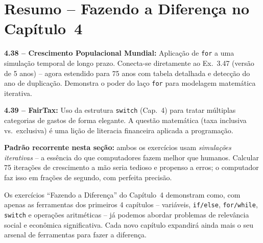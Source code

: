 \documentclass[12pt,a4paper]{article}
\begin{document}
\newpage

\section*{Resumo -- Fazendo a Diferença no Capítulo~4}

\begin{tcolorbox}[colback=deitellightblue,colframe=deitelblue,
  title={\bfseries Conexões e progressão}]

\textbf{4.38 -- Crescimento Populacional Mundial:}
Aplicação de \texttt{for} a uma simulação temporal de longo prazo. Conecta-se diretamente
ao Ex.~3.47 (versão de 5 anos) -- agora estendido para 75 anos com tabela detalhada
e detecção do ano de duplicação. Demonstra o poder do laço \texttt{for} para
modelagem matemática iterativa.

\medskip\textbf{4.39 -- FairTax:}
Uso da estrutura \texttt{switch} (Cap.~4) para tratar múltiplas categorias de gastos
de forma elegante. A questão matemática (taxa inclusiva vs.\ exclusiva) é uma lição
de literacia financeira aplicada a programação.

\medskip\textbf{Padrão recorrente nesta seção:} ambos os exercícios usam
\textit{simulações iterativas} -- a essência do que computadores fazem melhor que
humanos. Calcular 75 iterações de crescimento a mão seria tedioso e propenso a
erros; o computador faz isso em frações de segundo, com perfeita precisão.

\end{tcolorbox}

\begin{boaprática}
  Os exercícios ``Fazendo a Diferença'' do Capítulo~4 demonstram como, com apenas as
  ferramentas dos primeiros 4 capítulos -- variáveis, \texttt{if/else}, \texttt{for/while},
  \texttt{switch} e operações aritméticas -- já podemos abordar problemas de relevância
  social e econômica significativa. Cada novo capítulo expandirá ainda mais o seu
  arsenal de ferramentas para fazer a diferença.
\end{boaprática}
\end{document}
